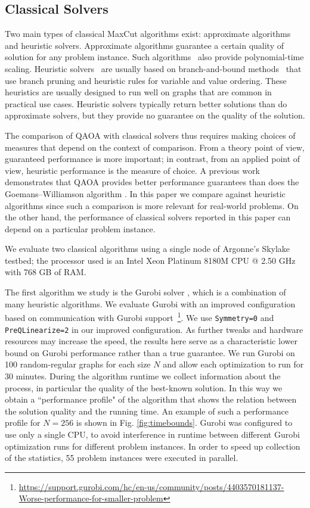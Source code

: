 \subsection{Classical Solvers}
\label{sec:meth_classical}


Two main types of classical MaxCut algorithms exist: approximate algorithms and heuristic solvers.
Approximate algorithms guarantee a certain quality of solution for any problem instance. Such algorithms~\cite{Halperin_MaxCut,gw-algo} 
also provide polynomial-time scaling.
Heuristic solvers~\cite{gurobi, MQLib} are usually based on branch-and-bound methods~\cite{gurobi_mip} that use branch pruning and heuristic rules for  variable and value ordering. These heuristics are usually 
designed to run well on graphs that are common in practical use cases.
Heuristic solvers typically return better solutions than do approximate solvers,
but they provide no guarantee on the quality of the solution.

The comparison of QAOA with classical solvers thus requires making choices of measures that depend on the context of comparison. From a theory point of view, guaranteed performance is more important; in contrast, from an applied point of view, heuristic performance is the measure of choice.
A previous work \cite{Wurtz_guarantee} demonstrates that
QAOA provides better performance guarantees than does the Goemans--Williamson algorithm \cite{gw-algo}.
In this paper we  compare against heuristic algorithms since such a comparison is more 
relevant for real-world problems.
On the other hand, the performance of classical solvers reported in this paper
can depend on a particular problem instance.

We evaluate two classical algorithms using a single node of Argonne's Skylake testbed; the processor used is an Intel Xeon Platinum 8180M CPU @ 2.50 GHz with 768 GB of RAM.

The first algorithm we study is the Gurobi solver \cite{gurobi}, which is a combination of many heuristic algorithms.
We evaluate Gurobi with an improved configuration based on communication with 
Gurobi support~\footnote{\url{https://support.gurobi.com/hc/en-us/community/posts/4403570181137-Worse-performance-for-smaller-problem}}.
We use \texttt{Symmetry=0} and \texttt{PreQLinearize=2} in our improved configuration.
As further tweaks and hardware resources may increase the speed, the results here serve as a characteristic lower bound on Gurobi performance rather than a true guarantee. 
We run Gurobi on 100 random-regular graphs for each size $N$ and allow each optimization to run for 30 minutes.
During the algorithm runtime we collect information about the process, in particular the quality of the best-known solution.
In this way we obtain a ``performance profile" 
of the algorithm that shows the relation between the solution quality and the running time. An example of such a performance profile for $N=256$ is shown in Fig. \ref{fig:timebounds}.
Gurobi was configured to use only a single CPU, to avoid interference in runtime between different Gurobi optimization runs for different problem instances. In order to speed up collection of the statistics, 
55 problem instances were executed in parallel.

